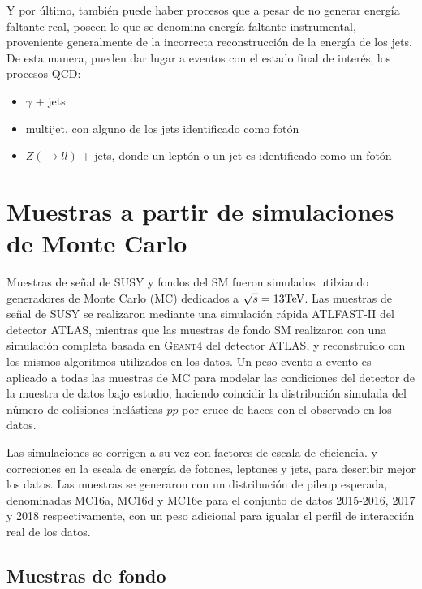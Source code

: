 Y por último, también puede haber procesos que a pesar de no generar energía faltante real, poseen lo que se denomina energía faltante instrumental, proveniente generalmente de la incorrecta reconstrucción de la energía de los jets. De esta manera, pueden dar lugar a eventos con el estado final de interés, los procesos QCD:

\begin{itemize}

	\item $\gamma$ + jets

	\item multijet, con alguno de los jets identificado como fotón

	\item $Z(\rightarrow ll)$ + jets, donde un leptón o un jet es identificado como un fotón

\end{itemize}


\section{Muestras a partir de simulaciones de Monte Carlo}

Muestras de señal de SUSY y fondos del SM fueron simulados
utilziando generadores de Monte Carlo (MC) dedicados a $\sqrt{s} = 13 \text{TeV}$.
Las muestras de señal de SUSY se realizaron mediante una simulación rápida \textsc{ATLFAST-II} \cite{Richter-Was:683751} del detector ATLAS, mientras que las muestras de fondo SM realizaron con una simulación completa basada en \textsc{Geant4}\cite{Geant4} del detector ATLAS, y reconstruido con los mismos
algoritmos utilizados en los datos. Un peso evento a evento es aplicado
a todas las muestras de MC para modelar las condiciones del detector de la muestra de datos bajo estudio,
haciendo coincidir la distribución simulada del número de colisiones inelásticas $pp$ por cruce de haces con el observado en los datos.

Las simulaciones se corrigen a su vez con factores de escala de eficiencia.
y correciones en la escala de energía de fotones, leptones y
jets, para describir mejor los datos. Las muestras se generaron con un
distribución de pileup esperada, denominadas MC16a, MC16d y MC16e para el conjunto de datos 2015-2016, 2017 y
2018 respectivamente, con un peso adicional para igualar
el perfil de interacción real de los datos. 


\subsection{Muestras de fondo}

